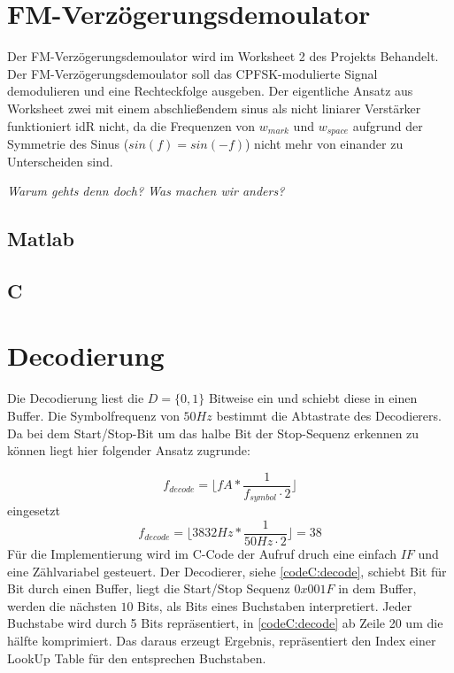 \documentclass{article}
\begin{document}
\section{FM-Verzögerungsdemoulator} \label{sec:fm-demod}
Der FM-Verzögerungsdemoulator wird im Worksheet 2 des Projekts Behandelt. 
Der FM-Verzögerungsdemoulator soll das CPFSK-modulierte Signal demodulieren und eine Rechteckfolge ausgeben.
Der eigentliche Ansatz aus Worksheet zwei mit einem abschließendem sinus als nicht liniarer Verstärker funktioniert idR nicht, 
da die Frequenzen von $w_{mark}$ und $w_{space}$ aufgrund der Symmetrie des Sinus ($sin(f) = sin(-f)$) nicht mehr von einander zu Unterscheiden sind.

\textit{Warum gehts denn doch? Was machen wir anders?}
\subsection{Matlab}

\subsection{C}

\section{Decodierung}

Die Decodierung liest die $D = \{0,1\}$ Bitweise ein und schiebt diese in einen Buffer. 
Die Symbolfrequenz von $50Hz$ bestimmt die Abtastrate des Decodierers. Da bei dem Start/Stop-Bit um das
halbe Bit der Stop-Sequenz erkennen zu können liegt hier folgender Ansatz zugrunde:

$$
f_{decode} = \lfloor fA * \frac{1}{f_{symbol} \cdot 2}\rfloor 
$$
eingesetzt
$$
f_{decode} = \lfloor 3832Hz * \frac{1}{50Hz\cdot 2}\rfloor = 38
$$
Für die Implementierung wird im C-Code der Aufruf druch eine einfach $IF$ und eine Zählvariabel
gesteuert. Der Decodierer, siehe \ref{codeC:decode}, schiebt Bit für Bit durch einen Buffer, liegt
die Start/Stop Sequenz $0x001F$ in dem Buffer, werden die nächsten $10$ Bits, als Bits eines Buchstaben interpretiert.
Jeder Buchstabe wird durch 5 Bits repräsentiert, in \ref{codeC:decode} ab Zeile 20 um die hälfte komprimiert.
Das daraus erzeugt Ergebnis, repräsentiert den Index einer LookUp Table für den entsprechen Buchstaben.
\end{document}
